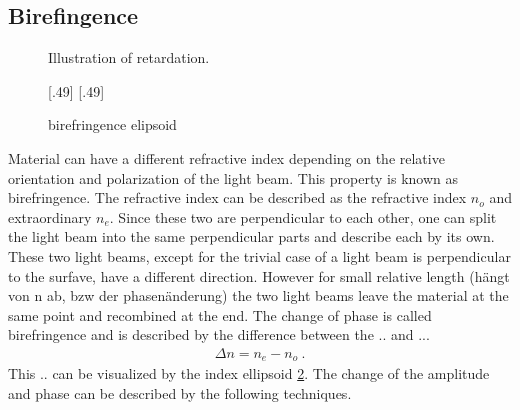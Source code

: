 \subsection{Birefingence}
%
\begin{figure}[!t]
\centering
\def\tikzwidth{\textwidth}
\caption{Illustration of retardation.}
\label{fig:optic_retardation}
\end{figure}
% 
\begin{figure}[!t]
\centering
\subcaptionbox{}[.49\textwidth]{
\def\tikzwidth{0.49*\textwidth}
}
\subcaptionbox{}[.49\textwidth]{
\def\tikzwidth{0.49*\textwidth}
}
\caption{birefringence elipsoid}
\label{fig:index_elipsoid}
\end{figure}
% 
Material can have a different refractive index depending on the relative orientation and polarization of the light beam.
This property is known as birefringence.
The refractive index can be described as the refractive index $n_o$ and extraordinary  $n_e$.
Since these two are perpendicular to each other, one can split the light beam into the same perpendicular parts and describe each by its own.
These two light beams, except for the trivial case of a light beam is perpendicular to the surfave, have a different direction.
However for small relative length (hängt von n ab, bzw der phasenänderung) the two light beams leave the material at the same point and recombined at the end.
The change of phase is called birefringence and is described by the difference between the .. and ...
% 
\begin{align}
    \Delta n = n_e - n_o \> .
\end{align}
% 
This .. can be visualized by the index ellipsoid \cref{fig:index_elipsoid}.
The change of the amplitude and phase can be described by the following techniques.
% 
% 
% 
